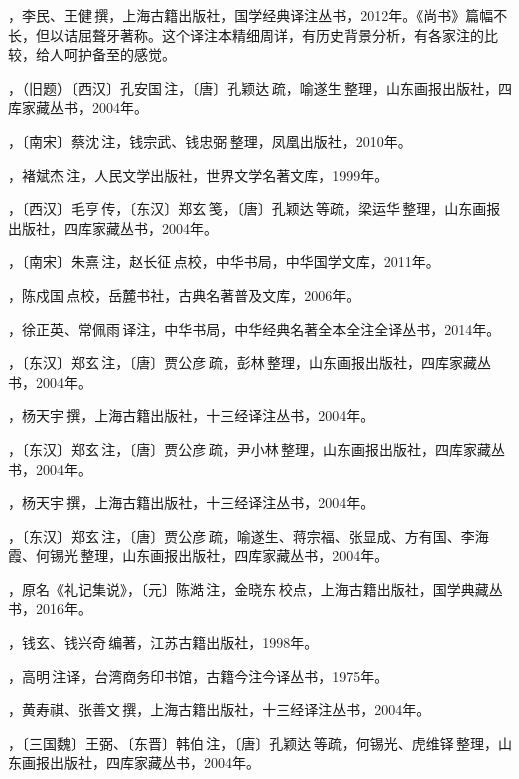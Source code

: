 ，李民、王健\,撰，上海古籍出版社，国学经典译注丛书，2012年。《尚书》篇幅不长，但以诘屈聱牙著称。这个译注本精细周详，有历史背景分析，有各家注的比较，给人呵护备至的感觉。

，（旧题）〔西汉〕孔安国\,注，〔唐〕孔颖达\,疏，喻遂生\,整理，山东画报出版社，四库家藏丛书，2004年。

，〔南宋〕蔡沈\,注，钱宗武、钱忠弼\,整理，凤凰出版社，2010年。

，褚斌杰\,注，人民文学出版社，世界文学名著文库，1999年。

，〔西汉〕毛亨\,传，〔东汉〕郑玄\,笺，〔唐〕孔颖达\,等疏，梁运华\,整理，山东画报出版社，四库家藏丛书，2004年。

，〔南宋〕朱熹\,注，赵长征\,点校，中华书局，中华国学文库，2011年。

，陈戍国\,点校，岳麓书社，古典名著普及文库，2006年。

，徐正英、常佩雨\,译注，中华书局，中华经典名著全本全注全译丛书，2014年。

，〔东汉〕郑玄\,注，〔唐〕贾公彦\,疏，彭林\,整理，山东画报出版社，四库家藏丛书，2004年。

，杨天宇\,撰，上海古籍出版社，十三经译注丛书，2004年。

，〔东汉〕郑玄\,注，〔唐〕贾公彦\,疏，尹小林\,整理，山东画报出版社，四库家藏丛书，2004年。

，杨天宇\,撰，上海古籍出版社，十三经译注丛书，2004年。

，〔东汉〕郑玄\,注，〔唐〕贾公彦\,疏，喻遂生、蒋宗福、张显成、方有国、李海霞、何锡光\,整理，山东画报出版社，四库家藏丛书，2004年。

，原名《礼记集说》，〔元〕陈澔\,注，金晓东\,校点，上海古籍出版社，国学典藏丛书，2016年。

，钱玄、钱兴奇\,编著，江苏古籍出版社，1998年。

，高明\,注译，台湾商务印书馆，古籍今注今译丛书，1975年。

，黄寿祺、张善文\,撰，上海古籍出版社，十三经译注丛书，2004年。

，〔三国魏〕王弼、〔东晋〕韩伯\,注，〔唐〕孔颖达\,等疏，何锡光、虎维铎\,整理，山东画报出版社，四库家藏丛书，2004年。

